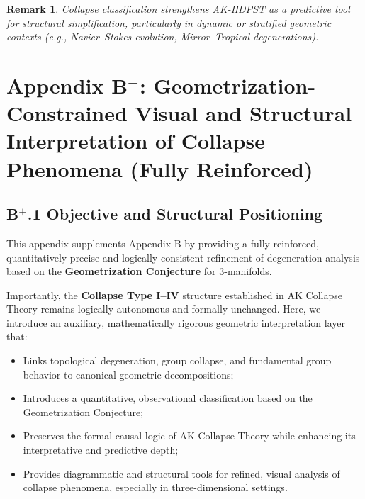 \documentclass[11pt]{article}
\newtheorem{remark}[theorem]{Remark}
\begin{document}
\begin{remark}
Collapse classification strengthens AK-HDPST as a predictive tool for structural simplification, particularly in dynamic or stratified geometric contexts (e.g., Navier–Stokes evolution, Mirror–Tropical degenerations).
\end{remark}




\section*{Appendix B$^{+}$: Geometrization-Constrained Visual and Structural Interpretation of Collapse Phenomena (Fully Reinforced)}

\subsection*{B$^{+}$.1 Objective and Structural Positioning}

This appendix supplements Appendix B by providing a fully reinforced, quantitatively precise and logically consistent refinement of degeneration analysis based on the \textbf{Geometrization Conjecture} for $3$-manifolds.

Importantly, the \textbf{Collapse Type I–IV} structure established in AK Collapse Theory remains logically autonomous and formally unchanged. Here, we introduce an auxiliary, mathematically rigorous geometric interpretation layer that:

\begin{itemize}
    \item Links topological degeneration, group collapse, and fundamental group behavior to canonical geometric decompositions;
    \item Introduces a quantitative, observational classification based on the Geometrization Conjecture;
    \item Preserves the formal causal logic of AK Collapse Theory while enhancing its interpretative and predictive depth;
    \item Provides diagrammatic and structural tools for refined, visual analysis of collapse phenomena, especially in three-dimensional settings.
\end{itemize}
\end{document}
